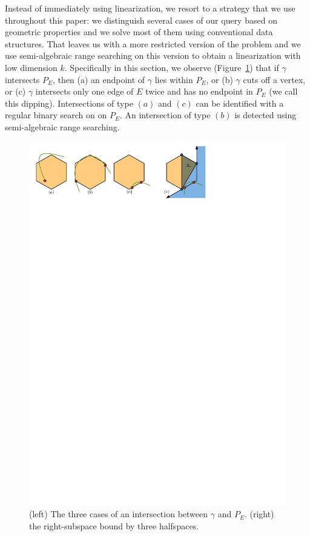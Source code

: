 \documentclass[UKenglish]{lipics-v2019}
\begin{document}
\noindent
Instead of immediately using linearization, we resort to a strategy that we use throughout this paper: we distinguish several cases of our query based on geometric properties and we solve most of them using conventional data structures. That leaves us with a more restricted version of the problem and we use semi-algebraic range searching on this version to obtain a linearization with low dimension $k$. 
Specifically in this section, we observe (Figure~\ref{fig:intersectionsearch}) that if $\gamma$ intersects $P_E$, then (a) an endpoint of $\gamma$ lies within $P_E$, or (b) $\gamma$ cuts off a vertex, or (c) $\gamma$ intersects only one edge of $E$ twice and has no endpoint in $P_E$ (we call this dipping). Intersections of type $(a)$ and $(c)$ can be identified with a regular binary search on on $P_E$. An intersection of type $(b)$ is detected using semi-algebraic range searching.
%
\begin{figure}[h]
    \centering
    \includegraphics{../intersectionsearch}
    \caption{(left) The three cases of an intersection between $\gamma$ and $P_E$. (right) the right-subspace bound by three halfspaces.}
    \label{fig:intersectionsearch}
\end{figure}
\end{document}
